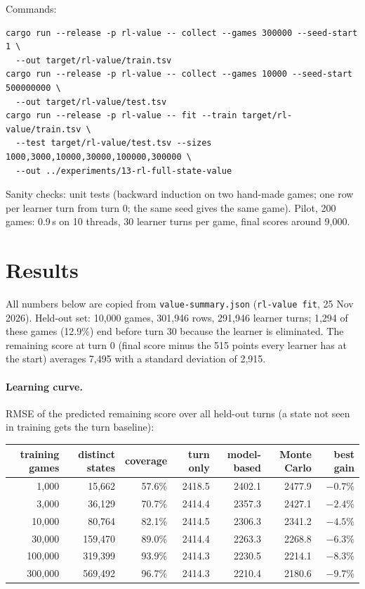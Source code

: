 \documentclass{../polyexp}
\begin{document}
Commands:
\begin{verbatim}
cargo run --release -p rl-value -- collect --games 300000 --seed-start 1 \
  --out target/rl-value/train.tsv
cargo run --release -p rl-value -- collect --games 10000 --seed-start 500000000 \
  --out target/rl-value/test.tsv
cargo run --release -p rl-value -- fit --train target/rl-value/train.tsv \
  --test target/rl-value/test.tsv --sizes 1000,3000,10000,30000,100000,300000 \
  --out ../experiments/13-rl-full-state-value
\end{verbatim}
Sanity checks: unit tests (backward induction on two hand-made games; one row per learner turn from turn 0;
the same seed gives the same game). Pilot, 200 games: 0.9\,s on 10 threads, 30 learner turns per game, final
scores around 9{,}000.

\section{Results}
\ExpResults

All numbers below are copied from \texttt{value-summary.json} (\texttt{rl-value fit}, 25 Nov 2026). Held-out set:
10{,}000 games, 301{,}946 rows, 291{,}946 learner turns; 1{,}294 of these games (12.9\%) end before turn 30
because the learner is eliminated. The remaining score at turn 0 (final score minus the 515 points every
learner has at the start) averages 7{,}495 with a standard deviation of 2{,}915.

\paragraph{Learning curve.} RMSE of the predicted remaining score over all held-out turns (a state not seen in
training gets the turn baseline):

\begin{center}\small
\begin{tabular}{rrrrrrr}
\toprule
training games & distinct states & coverage & turn only & model-based & Monte Carlo & best gain \\
\midrule
1{,}000   & 15{,}662  & 57.6\% & 2418.5 & 2402.1 & 2477.9 & $-0.7\%$ \\
3{,}000   & 36{,}129  & 70.7\% & 2414.4 & 2357.3 & 2427.1 & $-2.4\%$ \\
10{,}000  & 80{,}764  & 82.1\% & 2414.5 & 2306.3 & 2341.2 & $-4.5\%$ \\
30{,}000  & 159{,}470 & 89.0\% & 2414.4 & 2263.3 & 2268.8 & $-6.3\%$ \\
100{,}000 & 319{,}399 & 93.9\% & 2414.3 & 2230.5 & 2214.1 & $-8.3\%$ \\
300{,}000 & 569{,}492 & 96.7\% & 2414.3 & 2210.4 & 2180.6 & $-9.7\%$ \\
\bottomrule
\end{tabular}
\end{center}
\end{document}
